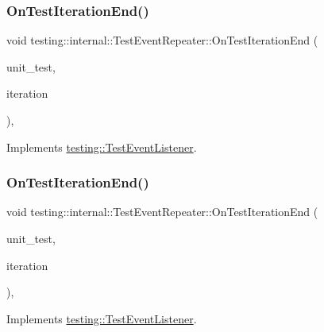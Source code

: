 \subsubsection{\texorpdfstring{OnTestIterationEnd()}{OnTestIterationEnd()}\hspace{0.1cm}{\footnotesize\ttfamily [2/3]}}
{\footnotesize\ttfamily void testing\+::internal\+::\+Test\+Event\+Repeater\+::\+On\+Test\+Iteration\+End (\begin{DoxyParamCaption}\item[{const \mbox{\hyperlink{classtesting_1_1_unit_test}{Unit\+Test}} \&}]{unit\+\_\+test,  }\item[{int}]{iteration }\end{DoxyParamCaption})\hspace{0.3cm}{\ttfamily [override]}, {\ttfamily [virtual]}}



Implements \mbox{\hyperlink{classtesting_1_1_test_event_listener_a550fdb3e55726e4cefa09f5697941425}{testing\+::\+Test\+Event\+Listener}}.

\mbox{\label{classtesting_1_1internal_1_1_test_event_repeater_aa4a52e544380946ff86fc57915aa7152}} 
\subsubsection{\texorpdfstring{OnTestIterationEnd()}{OnTestIterationEnd()}\hspace{0.1cm}{\footnotesize\ttfamily [3/3]}}
{\footnotesize\ttfamily void testing\+::internal\+::\+Test\+Event\+Repeater\+::\+On\+Test\+Iteration\+End (\begin{DoxyParamCaption}\item[{const \mbox{\hyperlink{classtesting_1_1_unit_test}{Unit\+Test}} \&}]{unit\+\_\+test,  }\item[{int}]{iteration }\end{DoxyParamCaption})\hspace{0.3cm}{\ttfamily [override]}, {\ttfamily [virtual]}}



Implements \mbox{\hyperlink{classtesting_1_1_test_event_listener_a550fdb3e55726e4cefa09f5697941425}{testing\+::\+Test\+Event\+Listener}}.

